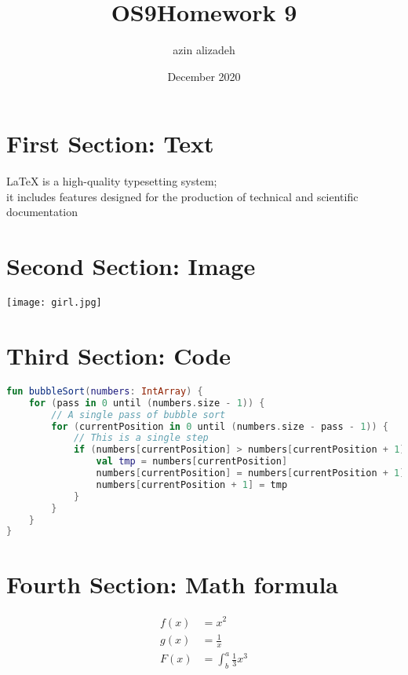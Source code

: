 \documentclass{article}
\title{OS9}
\author{azin alizadeh }
\date{December 2020}
\begin{document}
\title{Homework 9}
\maketitle

\section{First Section: Text}
LaTeX is a high-quality typesetting system;\\
it includes features designed for the production of technical and scientific documentation\\

\section{Second Section: Image}
  \texttt{[image: girl.jpg]}
  
\section{Third Section: Code}
\begin{lstlisting}[language=kotlin]
fun bubbleSort(numbers: IntArray) {
    for (pass in 0 until (numbers.size - 1)) {
        // A single pass of bubble sort
        for (currentPosition in 0 until (numbers.size - pass - 1)) {
            // This is a single step
            if (numbers[currentPosition] > numbers[currentPosition + 1]) {
                val tmp = numbers[currentPosition]
                numbers[currentPosition] = numbers[currentPosition + 1]
                numbers[currentPosition + 1] = tmp
            }
        }
    }
}
\end{lstlisting}
 
\section{Fourth Section: Math formula}
\begin{align*}
  f(x) &= x^2\\
  g(x) &= \frac{1}{x}\\
  F(x) &= \int^a_b \frac{1}{3}x^3
\end{align*}
\end{document}
